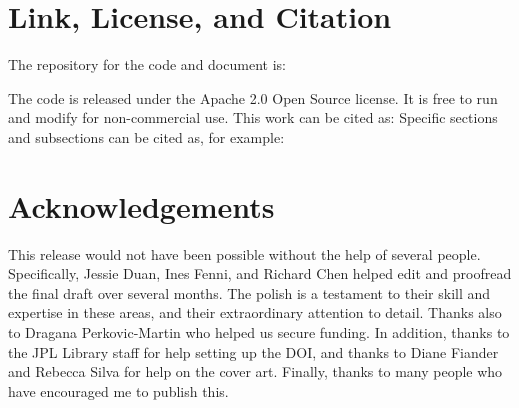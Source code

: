 \clearpage
\newpage

\section{Link, License, and Citation}
\vspace{-2mm}
The repository for the code and document is:
\newline
\newline
\begin{centering}
\end{centering}
\newline
\newline
The code is released under the Apache 2.0 Open Source license. It is free to run and modify for non-commercial use. 
\vspace{-2mm}
\newline
\newline
This work can be cited as:
\vspace{-2mm}
\newline
\newline
\noindent
{}
\newline
\newline
\vspace{-2mm}
\newline
\vspace{-2mm}
Specific sections and subsections can be cited as, for example:
\newline
\newline
\noindent
{}

\vspace{-2mm}
\section{Acknowledgements}
\vspace{-2mm}
This release would not have been possible without the help of several people. Specifically, Jessie Duan, Ines Fenni, and Richard Chen helped edit and proofread the final draft over several months. The polish is a testament to their skill and expertise in these areas, and their extraordinary attention to detail. Thanks also to Dragana Perkovic-Martin who helped us secure funding. In addition, thanks to the JPL Library staff for help setting up the DOI, and thanks to Diane Fiander and Rebecca Silva for help on the cover art. Finally, thanks to many people who have encouraged me to publish this. 


